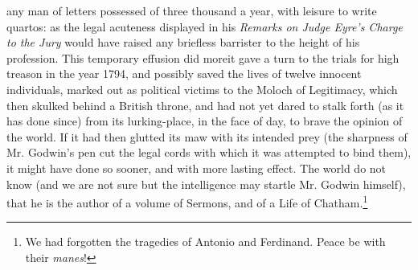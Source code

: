 any man of letters possessed of three thousand a year, with
leisure to write quartos: as the legal acuteness displayed in his
\emph{Remarks on Judge Eyre's Charge to the Jury} would have
raised any briefless barrister to the height of his
profession. This temporary effusion did more\textemdash it gave a
turn to the trials for high treason in the year 1794, and possibly
saved the lives of twelve innocent individuals, marked out as
political victims to the Moloch of Legitimacy, which then skulked
behind a British throne, and had not yet dared to stalk forth (as
it has done since) from its lurking-place, in the face of day, to
brave the opinion of the world. If it had then glutted its maw
with its intended prey (the sharpness of Mr.  Godwin's pen cut the
legal cords with which it was attempted to bind them), it might
have done so sooner, and with more lasting effect. The world do
not know (and we are not sure but the intelligence may startle
Mr. Godwin himself), that he is the author of a volume of Sermons,
and of a Life of Chatham.\footnote{We had forgotten the tragedies
of Antonio and Ferdinand.  Peace be with their \emph{manes}!}


